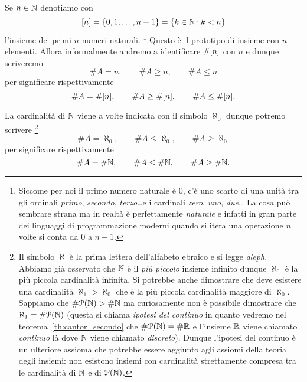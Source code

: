 \begin{definition}
Se $n\in {\mathbb N}$ denotiamo con 
\[
  {\left[ n \right]} 
  = {\left\{ 0,1,\dots, n-1 \right\}}
  = {\left\{ k\in {\mathbb N}\colon k<n \right\}}
\]
l'insieme dei primi $n$ numeri naturali.
\footnote{Siccome per noi il primo numero naturale è $0$, c'è uno scarto di 
una unità tra gli ordinali \emph{primo}, \emph{secondo}, \emph{terzo}\dots e i cardinali \emph{zero},
 \emph{uno}, \emph{due}\dots
La cosa può sembrare strana ma in realtà è perfettamente \emph{naturale}
e infatti in gran parte dei linguaggi di programmazione moderni quando 
si itera una operazione $n$ volte si conta da $0$ a $n-1$.}
Questo è il prototipo di insieme con $n$ elementi.
Allora informalmente andremo a identificare $\#{\left[ n \right]}$ con $n$ e 
dunque scriveremo 
\[
   \#A = n, \qquad \#A\ge n, \qquad \#A\le n
\]
per significare rispettivamente
\[
  \#A = \#{\left[ n \right]}, \qquad \#A \ge \#{\left[ n \right]}, \qquad \#A\le \#{\left[ n \right]}.  
\]

La cardinalità di ${\mathbb N}$ viene a volte indicata con il simbolo
%
%
$\aleph_0$ dunque potremo scrivere  
\footnote{%
Il simbolo $\aleph$ è la prima lettera dell'alfabeto ebraico 
e si legge \emph{aleph}. \\
Abbiamo già osservato che ${\mathbb N}$ è il \emph{più piccolo} insieme 
infinito dunque $\aleph_0$ è la più piccola 
cardinalità infinita. 
Si potrebbe anche dimostrare che deve esistere una cardinalità $\aleph_1>\aleph_0$
che è la più piccola cardinalità maggiore di $\aleph_0$.
Sappiamo che $\# \mathcal P({\mathbb N})>\# {\mathbb N}$ ma curiosamente non è possibile dimostrare 
che $\aleph_1 = \# \mathcal P({\mathbb N})$ (questa si chiama \emph{ipotesi del continuo}
%
%
in quanto vedremo nel teorema~\ref{th:cantor_secondo} che $\# \mathcal P({\mathbb N})=\#{\mathbb R}$
e l'insieme ${\mathbb R}$ viene chiamato \emph{continuo} là dove ${\mathbb N}$ 
viene chiamato \emph{discreto}).
Dunque l'ipotesi del continuo è un ulteriore assioma che potrebbe essere 
aggiunto agli assiomi della teoria degli insiemi: 
non esistono insiemi con cardinalità strettamente compresa tra 
le cardinalità di ${\mathbb N}$ e di $\mathcal P({\mathbb N})$.
}%
\[
    \# A = \aleph_0, \qquad
    \#A \le \aleph_0, \qquad
    \# A\ge \aleph_0
\]
per significare rispettivamente 
\[
  \# A = \# {\mathbb N}, \qquad
  \# A \le \# {\mathbb N}, \qquad
  \# A \ge \# {\mathbb N}.  
\]
\end{definition}
  
